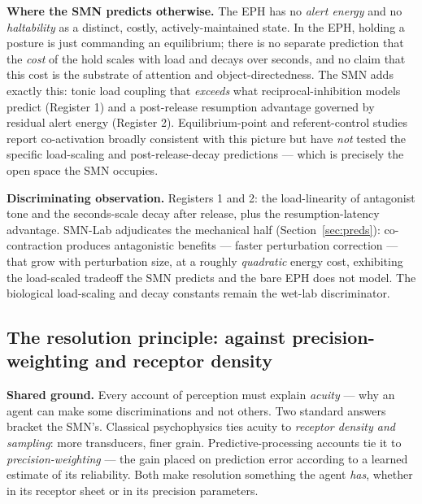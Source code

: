 \documentclass[utf8]{FrontiersinHarvard} %
\begin{document}
\textbf{Where the SMN predicts otherwise.} The EPH has no \emph{alert energy} and no \emph{haltability} as a distinct, costly, actively-maintained state. In the EPH, holding a posture is just commanding an equilibrium; there is no separate prediction that the \emph{cost} of the hold scales with load and decays over seconds, and no claim that this cost is the substrate of attention and object-directedness. The SMN adds exactly this: tonic load coupling that \emph{exceeds} what reciprocal-inhibition models predict (Register 1) and a post-release resumption advantage governed by residual alert energy (Register 2). Equilibrium-point and referent-control studies report co-activation broadly consistent with this picture but have \emph{not} tested the specific load-scaling and post-release-decay predictions --- which is precisely the open space the SMN occupies.

\textbf{Discriminating observation.} Registers 1 and 2: the load-linearity of antagonist tone and the seconds-scale decay after release, plus the resumption-latency advantage. SMN-Lab adjudicates the mechanical half (Section~\ref{sec:preds}): co-contraction produces antagonistic benefits --- faster perturbation correction --- that grow with perturbation size, at a roughly \emph{quadratic} energy cost, exhibiting the load-scaled tradeoff the SMN predicts and the bare EPH does not model. The biological load-scaling and decay constants remain the wet-lab discriminator.

\subsection{The resolution principle: against precision-weighting and receptor density}\label{sec:resolution}
\textbf{Shared ground.} Every account of perception must explain \emph{acuity} --- why an agent can make some discriminations and not others. Two standard answers bracket the SMN's. Classical psychophysics ties acuity to \emph{receptor density and sampling}: more transducers, finer grain. Predictive-processing accounts tie it to \emph{precision-weighting} --- the gain placed on prediction error according to a learned estimate of its reliability. Both make resolution something the agent \emph{has}, whether in its receptor sheet or in its precision parameters.
\end{document}

